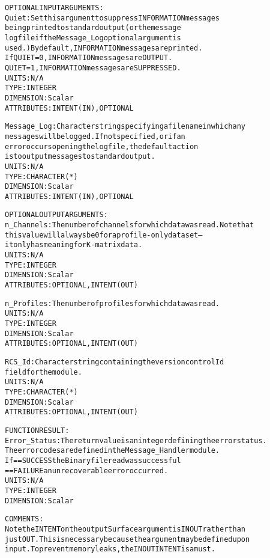 \begin{alltt}
  OPTIONAL INPUT ARGUMENTS:
        Quiet:        Set this argument to suppress INFORMATION messages
                      being printed to standard output (or the message
                      log file if the Message_Log optional argument is
                      used.) By default, INFORMATION messages are printed.
                      If QUIET = 0, INFORMATION messages are OUTPUT.
                         QUIET = 1, INFORMATION messages are SUPPRESSED.
                      UNITS:      N/A
                      TYPE:       INTEGER
                      DIMENSION:  Scalar
                      ATTRIBUTES: INTENT(IN), OPTIONAL
 
        Message_Log:  Character string specifying a filename in which any
                      messages will be logged. If not specified, or if an
                      error occurs opening the log file, the default action
                      is to output messages to standard output.
                      UNITS:      N/A
                      TYPE:       CHARACTER(*)
                      DIMENSION:  Scalar
                      ATTRIBUTES: INTENT(IN), OPTIONAL
 
  OPTIONAL OUTPUT ARGUMENTS:
        n_Channels:   The number of channels for which data was read. Note that
                      this value will always be 0 for a profile-only dataset--
                      it only has meaning for K-matrix data.
                      UNITS:      N/A
                      TYPE:       INTEGER
                      DIMENSION:  Scalar
                      ATTRIBUTES: OPTIONAL, INTENT(OUT)
 
        n_Profiles:   The number of profiles for which data was read.
                      UNITS:      N/A
                      TYPE:       INTEGER
                      DIMENSION:  Scalar
                      ATTRIBUTES: OPTIONAL, INTENT(OUT)
 
        RCS_Id:       Character string containing the version control Id
                      field for the module.
                      UNITS:      N/A
                      TYPE:       CHARACTER(*)
                      DIMENSION:  Scalar
                      ATTRIBUTES: OPTIONAL, INTENT(OUT)
 
  FUNCTION RESULT:
        Error_Status: The return value is an integer defining the error status.
                      The error codes are defined in the Message_Handler module.
                      If == SUCCESS the Binary file read was successful
                         == FAILURE an unrecoverable error occurred.
                      UNITS:      N/A
                      TYPE:       INTEGER
                      DIMENSION:  Scalar
 
  COMMENTS:
        Note the INTENT on the output Surface argument is IN OUT rather than
        just OUT. This is necessary because the argument may be defined upon
        input. To prevent memory leaks, the IN OUT INTENT is a must.
 
  \end{alltt}
